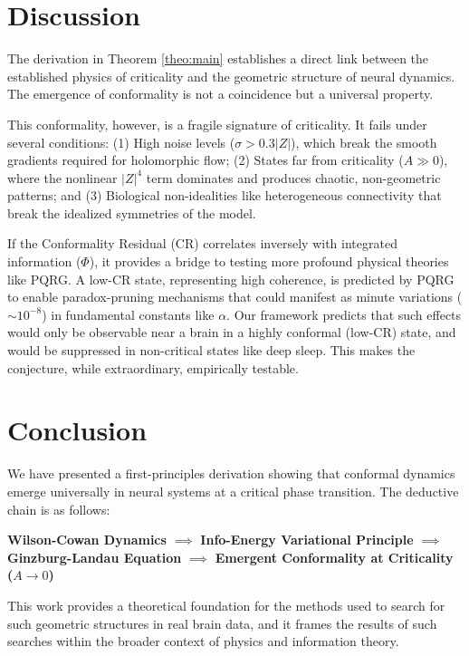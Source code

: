 \documentclass[12pt, reqno]{amsart}
\theoremstyle{definition}
\theoremstyle{remark}
\numberwithin{equation}{section}
\begin{document}
\section{Discussion}
The derivation in Theorem \ref{theo:main} establishes a direct link between the established physics of criticality and the geometric structure of neural dynamics. The emergence of conformality is not a coincidence but a universal property.

This conformality, however, is a fragile signature of criticality. It fails under several conditions: (1) High noise levels ($\sigma > 0.3 |Z|$), which break the smooth gradients required for holomorphic flow; (2) States far from criticality ($A \gg 0$), where the nonlinear $|Z|^4$ term dominates and produces chaotic, non-geometric patterns; and (3) Biological non-idealities like heterogeneous connectivity that break the idealized symmetries of the model.

If the Conformality Residual (CR) correlates inversely with integrated information ($\Phi$), it provides a bridge to testing more profound physical theories like PQRG. A low-CR state, representing high coherence, is predicted by PQRG to enable paradox-pruning mechanisms that could manifest as minute variations ($\sim10^{-8}$) in fundamental constants like $\alpha$. Our framework predicts that such effects would only be observable near a brain in a highly conformal (low-CR) state, and would be suppressed in non-critical states like deep sleep. This makes the conjecture, while extraordinary, empirically testable.

\section{Conclusion}
We have presented a first-principles derivation showing that conformal dynamics emerge universally in neural systems at a critical phase transition. The deductive chain is as follows:
\begin{center}
\textbf{Wilson-Cowan Dynamics} $\implies$ \textbf{Info-Energy Variational Principle} $\implies$ \textbf{Ginzburg-Landau Equation} $\implies$ \textbf{Emergent Conformality at Criticality ($A \to 0$)}
\end{center}
This work provides a theoretical foundation for the methods used to search for such geometric structures in real brain data, and it frames the results of such searches within the broader context of physics and information theory.
\end{document}
